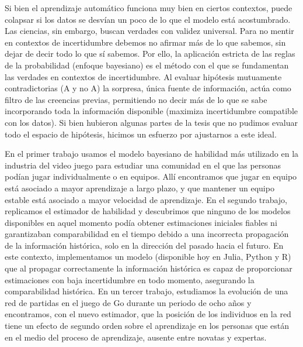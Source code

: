 \documentclass[a4paper,11pt]{book}
\theoremstyle{definition}
\begin{document}

Si bien el aprendizaje autom\'atico funciona muy bien en ciertos contextos, puede colapsar si los datos se desv\'ian un poco de lo que el modelo est\'a acostumbrado.
Las ciencias, sin embargo, buscan verdades con validez universal.
Para no mentir en contextos de incertidumbre debemos no afirmar m\'as de lo que sabemos, sin dejar de decir todo lo que s\'i sabemos.
Por ello, la aplicaci\'on estricta de las reglas de la probabilidad (enfoque bayesiano) es el m\'etodo con el que se fundamentan las verdades en contextos de incertidumbre.
Al evaluar hip\'otesis mutuamente contradictorias (A y no A) la sorpresa, \'unica fuente de informaci\'on, act\'ua como filtro de las creencias previas, permitiendo no decir m\'as de lo que se sabe incorporando toda la informaci\'on disponible (maximiza incertidumbre compatible con los datos).
Si bien hubieron algunas partes de la tesis que no pudimos evaluar todo el espacio de hip\'otesis, hicimos un esfuerzo por ajustarnos a este ideal.


En el primer trabajo usamos el modelo bayesiano de habilidad m\'as utilizado en la industria del video juego para estudiar una comunidad en el que las personas pod\'ian jugar individualmente o en equipos.
All\'i encontramos que jugar en equipo est\'a asociado a mayor aprendizaje a largo plazo, y que mantener un equipo estable est\'a asociado a mayor velocidad de aprendizaje.
En el segundo trabajo, replicamos el estimador de habilidad y descubrimos que ninguno de los modelos disponibles en aquel momento pod\'ia obtener estimaciones iniciales fiables ni garantizaban comparabilidad en el tiempo debido a una incorrecta propagaci\'on de la informaci\'on hist\'orica, solo en la direcci\'on del pasado hacia el futuro.
En este contexto, implementamos un modelo (disponible hoy en Julia, Python y R) que al propagar correctamente la informaci\'on hist\'orica es capaz de proporcionar estimaciones con baja incertidumbre en todo momento, asegurando la comparabilidad hist\'orica.
En un tercer trabajo, estudiamos la evoluci\'on de una red de partidas en el juego de Go durante un periodo de ocho a\~nos y encontramos, con el nuevo estimador, que la posici\'on de los individuos en la red tiene un efecto de segundo orden sobre el aprendizaje en los personas que est\'an en el medio del proceso de aprendizaje, ausente entre novatas y expertas.

\vspace{0.1cm}
\end{document}
